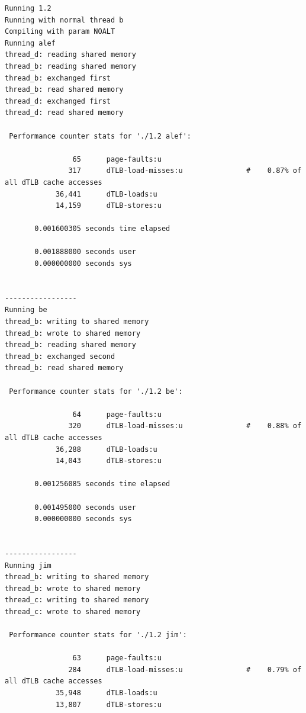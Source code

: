 \documentclass{article}
\begin{document}
\begin{latin}
\begin{lstlisting}
Running 1.2
Running with normal thread b
Compiling with param NOALT
Running alef
thread_d: reading shared memory
thread_b: reading shared memory
thread_b: exchanged first
thread_b: read shared memory
thread_d: exchanged first
thread_d: read shared memory

 Performance counter stats for './1.2 alef':

                65      page-faults:u                                                         
               317      dTLB-load-misses:u               #    0.87% of all dTLB cache accesses
            36,441      dTLB-loads:u                                                          
            14,159      dTLB-stores:u                                                         

       0.001600305 seconds time elapsed

       0.001888000 seconds user
       0.000000000 seconds sys


-----------------
Running be
thread_b: writing to shared memory
thread_b: wrote to shared memory
thread_b: reading shared memory
thread_b: exchanged second
thread_b: read shared memory

 Performance counter stats for './1.2 be':

                64      page-faults:u                                                         
               320      dTLB-load-misses:u               #    0.88% of all dTLB cache accesses
            36,288      dTLB-loads:u                                                          
            14,043      dTLB-stores:u                                                         

       0.001256085 seconds time elapsed

       0.001495000 seconds user
       0.000000000 seconds sys


-----------------
Running jim
thread_b: writing to shared memory
thread_b: wrote to shared memory
thread_c: writing to shared memory
thread_c: wrote to shared memory

 Performance counter stats for './1.2 jim':

                63      page-faults:u                                                         
               284      dTLB-load-misses:u               #    0.79% of all dTLB cache accesses
            35,948      dTLB-loads:u                                                          
            13,807      dTLB-stores:u                                                         


\end{lstlisting}
\end{latin}
\end{document}
